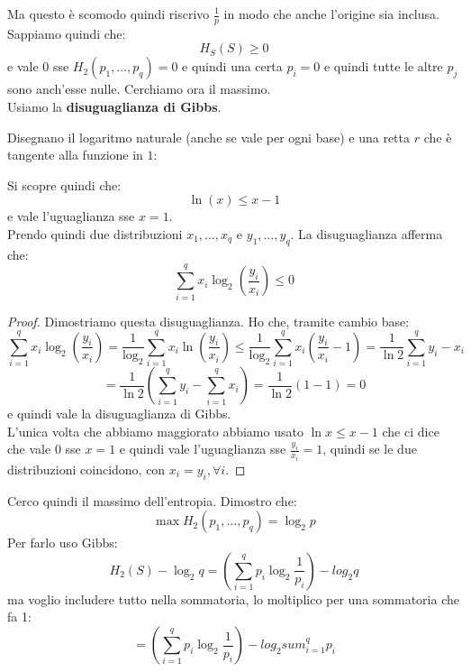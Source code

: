 \documentclass[a4paper,12pt, oneside]{book}
\begin{document}
Ma questo è scomodo quindi riscrivo $\frac{1}{p}$ in modo che anche l'origine
sia inclusa. \\
Sappiamo quindi che:
\[H_S(S)\geq 0\]
e vale 0 sse $H_2(p_1,\ldots, p_q)=0$ e quindi una certa $p_i=0$ e quindi tutte
le altre $p_j$ sono anch'esse nulle.
Cerchiamo ora il massimo.\\
Usiamo la \textbf{disuguaglianza di Gibbs}.
\begin{teorema}
  Disegnano il logaritmo naturale (anche se vale per ogni base) e
  una retta $r$ che è tangente alla funzione in $1$:
  \begin{figure}[H]
    \centering
  \end{figure}
  Si scopre quindi che:
  \[\ln (x)\leq x-1\]
  e vale l'uguaglianza sse $x=1$.\\
  Prendo quindi due distribuzioni $x_1,\ldots, x_q$ e $y_1,\ldots, y_q$. La
  disuguaglianza afferma che:
  \[\sum_{i=1}^q x_i\log_2\left(\frac{y_i}{x_i}\right)\leq 0\]
\end{teorema}
\begin{proof}
  Dimostriamo questa disuguaglianza. Ho che, tramite cambio base:
  \[\sum_{i=1}^q
    x_i\log_2\left(\frac{y_i}{x_i}\right)=\frac{1}{\log_2}\sum_{i=1}^q
    x_i\ln\left(\frac{y_i}{x_i}\right)\leq \frac{1}{\log_2}\sum_{i=1}^q
    x_i\left(\frac{y_i}{x_i}-1\right)=\frac{1}{\ln 2}\sum_{i=1}^q y_i-x_i\]
  \[=\frac{1}{\ln 2}\left(\sum_{i=1}^q y_i-\sum_{i=1}^q x_i\right)=\frac{1}{\ln
      2}(1-1)=0\]
  e quindi vale la disuguaglianza di Gibbs.\\
  L'unica volta che abbiamo maggiorato abbiamo usato $\ln x\leq x-1$ che ci
  dice che vale $0$ sse  $x=1$ e quindi vale l'uguaglianza sse
  $\frac{y_i}{x_i}=1$, quindi se le due distribuzioni coincidono, con
  $x_i=y_i,\forall i$.
\end{proof}
Cerco quindi il massimo dell'entropia. Dimostro che:
\[\max H_2(p_1,\ldots, p_q)=\log_2 p\]
Per farlo uso Gibbs:
\[H_2(S)-\log_2 q=\left(\sum_{i=1}^q p_i\log_2\frac{1}{p_i}\right)-log_2 q\]
ma voglio includere tutto nella sommatoria, lo moltiplico per una sommatoria che
fa 1:
\[=\left(\sum_{i=1}^q p_i\log_2\frac{1}{p_i}\right)-log_2 sum_{i=1}^qp_i\]
\end{document}
